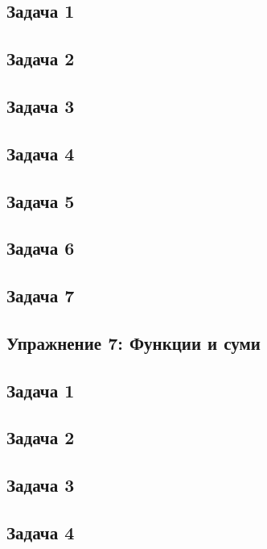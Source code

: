 \documentclass[fleqn, 12pt]{article}
\theoremstyle{definition}
\begin{document}
\subsection*{Задача 1}

\subsection*{Задача 2}

\subsection*{Задача 3}

\subsection*{Задача 4}

\subsection*{Задача 5}

\subsection*{Задача 6}

\subsection*{Задача 7}


\newpage
\subsection{Упражнение 7: Функции и суми}

\subsection*{Задача 1}

\subsection*{Задача 2}

\subsection*{Задача 3}

\subsection*{Задача 4}
\end{document}
